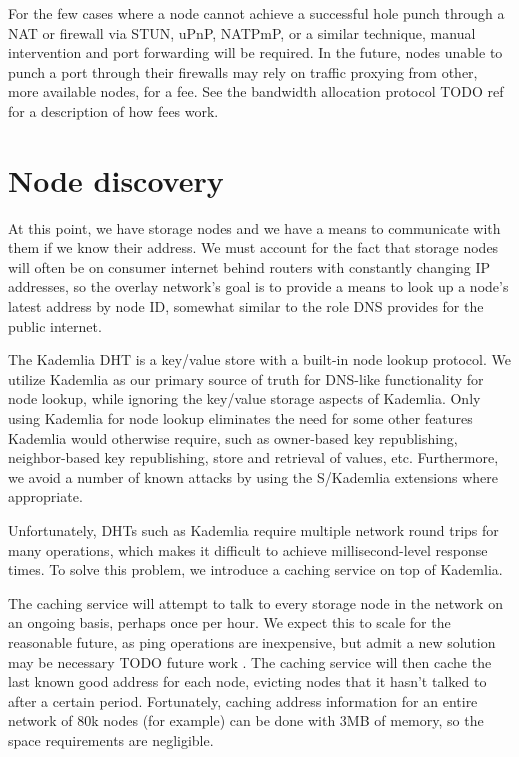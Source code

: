 \documentclass[11pt,fleqn,openany]{book}
\newcommand{\todo}[1]{{\color{red} TODO #1 }}
\begin{document}
For the few cases where a node cannot achieve a successful hole punch through a
NAT or firewall via STUN, uPnP, NATPmP, or a similar technique, manual
intervention and port forwarding will be required. In the future, nodes unable
to punch a port through their firewalls may rely on traffic proxying from
other, more available nodes, for a fee. See the bandwidth allocation protocol
\todo{ref} for a description of how fees work.

\section{Node discovery}

At this point, we have storage nodes and we have a means to communicate with
them if we know their address. We must account for the fact that storage nodes
will often be on consumer internet behind routers with constantly changing IP
addresses, so the overlay network's goal is to provide a means to look up a
node's latest address by node ID, somewhat similar to the role DNS provides
for the public internet.

The Kademlia DHT is a key/value store with a built-in node lookup protocol.
We utilize Kademlia as our primary source of truth for DNS-like
functionality for node lookup, while ignoring the key/value storage aspects of
Kademlia.
Only using Kademlia for node lookup eliminates the need for some other
features Kademlia would otherwise require, such as owner-based key
republishing, neighbor-based key republishing, store and retrieval of values,
etc. Furthermore, we avoid a number of known attacks by using the
S/Kademlia \cite{skad} extensions where appropriate.

Unfortunately, DHTs such as Kademlia require multiple network round trips for
many operations, which makes it difficult to achieve millisecond-level
response times. To solve this problem, we introduce a caching service on top
of Kademlia.

The caching service will attempt to talk to every storage node in the network
on an ongoing basis, perhaps once per hour. We expect this to scale for the
reasonable future, as ping operations are inexpensive, but admit a new solution
may be necessary \todo{future work}. The caching service will then cache
the last known good address for each node, evicting nodes that it hasn't talked
to after a certain period.
Fortunately, caching address information for an entire network of 80k nodes
(for example) can be done with 3MB of memory, so the space requirements are
negligible.
\end{document}
